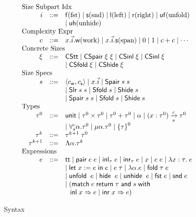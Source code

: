 \documentclass[preprint]{sigplanconf}
\newcommand{\thide}[1]{\left \{ #1 \right \}}
\newcommand{\arrow}[4]{#1\xrightarrow[#3]{#2}#4}
\newcommand{\symlet}{\mathsf{let\;}}
\newcommand{\symin}{\mathsf{\;in\;}}
\newcommand{\symand}{\mathsf{\;and\;}}
\newcommand{\symmatch}{\mathsf{match}}
\newcommand{\symwith}{\mathsf{\;with\;}}
\newcommand{\symreturn}{\mathsf{\;return\;}}
\newcommand{\syminl}{\mathsf{inl}}
\newcommand{\syminr}{\mathsf{inr}}
\newcommand{\symfold}{\mathsf{fold}}
\newcommand{\symSfold}{\mathsf{Sfold}}
\newcommand{\symunfold}{\mathsf{unfold}}
\newcommand{\symhide}{\mathsf{hide}}
\newcommand{\symShide}{\mathsf{Shide}}
\newcommand{\symunhide}{\mathsf{unhide}}
\newcommand{\sympair}{\mathsf{pair}}
\newcommand{\symtt}{\mathsf{tt}}
\newcommand{\symunit}{\mathsf{unit}}
\newcommand{\symCStt}{\mathsf{CStt}}
\newcommand{\symCSpair}{\mathsf{CSpair}}
\newcommand{\symCSinl}{\mathsf{CSinl}}
\newcommand{\symCSfold}{\mathsf{CSfold}}
\newcommand{\symCShide}{\mathsf{CShide}}
\newcommand{\intro}[2]{(#1 : #2)}
\newcommand{\symfst}{\mathsf{fst}}
\newcommand{\symsnd}{\mathsf{snd}}
\newcommand{\symuf}{\mathsf{uf}}
\newcommand{\symuh}{\mathsf{uh}}
\newcommand{\syml}{\mathsf{l}}
\newcommand{\symr}{\mathsf{r}}
\newcommand{\symf}{\mathsf{f}}
\newcommand{\syms}{\mathsf{s}}
\newcommand{\symSpair}{\mathsf{Spair}}
\newcommand{\symSlr}{\mathsf{Slr}}
\newcommand{\symwork}{\mathsf{w}}
\newcommand{\symspan}{\mathsf{s}}
\newcommand{\Sstats}[1]{\left \langle #1 \right \rangle}
\begin{document}
\begin{figure}
$$\begin{array}{rrcl}
  \multicolumn{4}{l}{\textrm{Size Subpart Idx}} \\
  & i &::=& \symf \textrm{(fst)} \mid \syms \textrm{(snd)} \mid \syml \textrm{(left)} \mid \symr \textrm{(right)} \mid \symuf \textrm{(unfold)} \\
  & & & \mid \symuh \textrm{(unhide)} \\
  \multicolumn{4}{l}{\textrm{Complexity Expr}} \\
  & c &::=& x.\vec{i}.\symwork \textrm{(work)} \mid x.\vec{i}.\symspan \textrm{(span)} \mid 0 \mid 1 \mid c+c \mid \cdots \\
  \multicolumn{4}{l}{\textrm{Concrete Sizes}} \\
  & \xi &::=& \symCStt \mid \symCSpair\;\xi\;\xi \mid \symCSinl\;\xi \mid \symCSinl\;\xi \\
  & & & \mid \symCSfold\;\xi \mid \symCShide\;\xi \\
  \multicolumn{4}{l}{\textrm{Size Specs}} \\
  & s &::=& \Sstats{c_\symwork,c_\symspan} \mid x.\vec{i} \mid \symSpair\;s\;s \\
  & & & \mid \symSlr\;s\;s \mid \symSfold\;s \mid \symShide\;s \\
  & & & \mid \symSpair\;s\;s \mid \symSfold\;s \mid \symShide\;s \\
  \multicolumn{4}{l}{\textrm{Types}} \\
  & \tau^0 &::=& \symunit \mid \tau^0\times\tau^0 \mid \tau^0+\tau^0 \mid \alpha \mid \arrow{\intro{x}{\tau^0}}{c}{s}{\tau^0} \\
  & & & \mid \forall^c_s \alpha.\tau^0 \mid \mu \alpha.\tau^0 \mid \thide\tau^0 \\
  & \tau^k &::=& \tau^{k+1}\;\tau^0 \\
  & \tau^{k+1} &::=& \Lambda \alpha.\tau^k \\
  \multicolumn{4}{l}{\textrm{Expressions}} \\
  & e &::=& \symtt \mid \sympair\;e\;e \mid \syminl_\tau\;e \mid \syminr_\tau\;e \mid x \mid e\;e \mid \lambda x:\tau.\;e \\
  & & & \mid \symlet x := e \symin e \mid e\;\tau \mid \lambda \alpha.e \mid \symfold\;\tau\;e \\
  & & & \mid \symunfold\;\;e \mid \symhide\;\;e \mid \symunhide\;\;e \mid \symfst\;e \mid \symsnd\;e \\
  & & & \mid (\symmatch\;e \symreturn \tau \symand s \symwith \\
  & & & \hspace{.1in} \syminl\;x\Rightarrow e\;|\;\syminr\;x\Rightarrow e)
\end{array}$$
\caption{\label{syntax}Syntax}
\end{figure}
\end{document}
